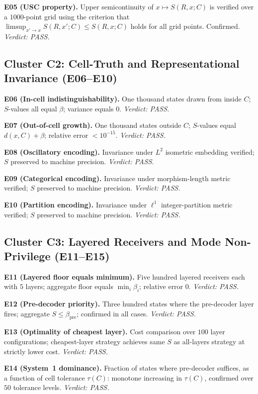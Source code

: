 \documentclass[twocolumn,11pt,a4paper]{article}
\begin{document}
\textbf{E05 (USC property).}  Upper semicontinuity of $x\mapsto S(R,x;C)$
is verified over a $1000$-point grid using the criterion that
$\limsup_{x'\to x}S(R,x';C)\leq S(R,x;C)$ holds for all grid points.
Confirmed.  \textit{Verdict: PASS.}

\subsection{Cluster C2: Cell-Truth and Representational Invariance (E06--E10)}
\label{sec:c2}

\textbf{E06 (In-cell indistinguishability).}  One thousand states drawn
from inside $C$; $S$-values all equal $\beta$; variance equals $0$.
\textit{Verdict: PASS.}

\textbf{E07 (Out-of-cell growth).}  One thousand states outside $C$;
$S$-values equal $d(x,C)+\beta$; relative error $<10^{-15}$.
\textit{Verdict: PASS.}

\textbf{E08 (Oscillatory encoding).}  Invariance under $L^2$ isometric
embedding verified; $S$ preserved to machine precision.
\textit{Verdict: PASS.}

\textbf{E09 (Categorical encoding).}  Invariance under morphism-length
metric verified; $S$ preserved to machine precision.
\textit{Verdict: PASS.}

\textbf{E10 (Partition encoding).}  Invariance under $\ell^1$
integer-partition metric verified; $S$ preserved to machine precision.
\textit{Verdict: PASS.}

\subsection{Cluster C3: Layered Receivers and Mode Non-Privilege (E11--E15)}
\label{sec:c3}

\textbf{E11 (Layered floor equals minimum).}  Five hundred layered
receivers each with $5$ layers; aggregate floor equals $\min_i\beta_i$;
relative error $0$.  \textit{Verdict: PASS.}

\textbf{E12 (Pre-decoder priority).}  Three hundred states where the
pre-decoder layer fires; aggregate $S\leq\beta_{\mathrm{pre}}$; confirmed
in all cases.  \textit{Verdict: PASS.}

\textbf{E13 (Optimality of cheapest layer).}  Cost comparison over $100$
layer configurations; cheapest-layer strategy achieves same $S$ as
all-layers strategy at strictly lower cost.  \textit{Verdict: PASS.}

\textbf{E14 (System~1 dominance).}  Fraction of states where pre-decoder
suffices, as a function of cell tolerance $\tau(C)$: monotone increasing
in $\tau(C)$, confirmed over $50$ tolerance levels.
\textit{Verdict: PASS.}
\end{document}
